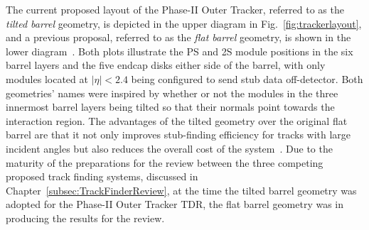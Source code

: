 The current proposed layout of the Phase-II Outer Tracker, referred to as the \emph{tilted barrel} geometry, is depicted in the upper diagram in Fig.~\ref{fig:trackerlayout}, and a previous proposal, referred to as the \emph{flat barrel} geometry, is shown in the lower diagram~\cite{CMS_Upgrade_TP}.
Both plots illustrate the PS and 2S module positions in the six barrel layers and the five endcap disks either side of the barrel, with only modules located at $|\eta| < 2.4$ being configured to send stub data off-detector.
Both geometries' names were inspired by whether or not the modules in the three innermost barrel layers being tilted so that their normals point towards the interaction region.
The advantages of the tilted geometry over the original flat barrel are that it not only improves stub-finding efficiency for tracks with large incident angles but also reduces the overall cost of the system~\cite{P2TrackerTDR}.
Due to the maturity of the preparations for the review between the three competing proposed track finding systems, discussed in Chapter~\ref{subsec:TrackFinderReview}, at the time the tilted barrel geometry was adopted for the Phase-II Outer Tracker TDR, the flat barrel geometry was in producing the results for the review.

